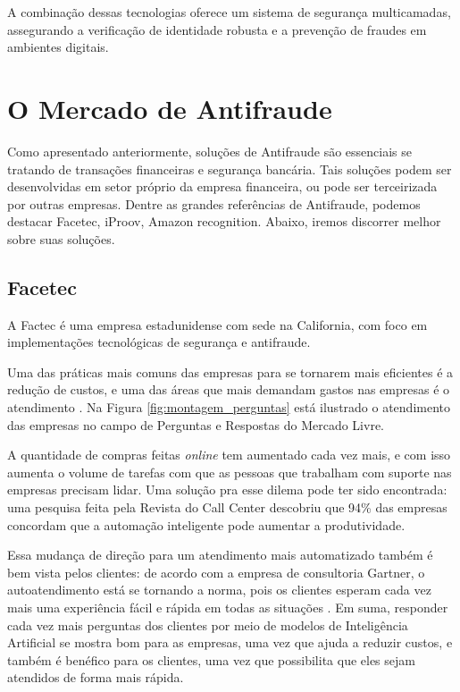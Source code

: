 A combinação dessas tecnologias oferece um sistema de segurança multicamadas, assegurando a verificação de identidade robusta e a prevenção de fraudes em ambientes digitais.

\section{O Mercado de Antifraude}
\label{mercado}
Como apresentado anteriormente, soluções de Antifraude são essenciais se tratando de transações financeiras e segurança bancária. Tais soluções podem ser desenvolvidas em setor próprio da empresa financeira, ou pode ser terceirizada por outras empresas. Dentre as grandes referências de Antifraude, podemos destacar Facetec, iProov, Amazon recognition. Abaixo, iremos discorrer melhor sobre suas soluções.

\subsection{Facetec}
\label{facetec}
A Factec é uma empresa estadunidense com sede na California, com foco em implementações tecnológicas de segurança e antifraude. 

Uma das práticas mais comuns das empresas para se tornarem mais eficientes é a redução de custos, e uma das áreas que mais demandam gastos nas empresas é o atendimento \cite{reduzir_custos}. Na Figura \ref{fig:montagem_perguntas} está ilustrado o atendimento das empresas no campo de Perguntas e Respostas do Mercado Livre.

A quantidade de compras feitas \textit{online} tem aumentado cada vez mais, e com isso aumenta o volume de tarefas com que as pessoas que trabalham com suporte nas empresas precisam lidar. Uma solução pra esse dilema pode ter sido encontrada: uma pesquisa feita pela Revista do Call Center \cite{reduzir_custos} descobriu que 94\% das empresas concordam que a automação inteligente pode aumentar a produtividade.

Essa mudança de direção para um atendimento mais automatizado também é bem vista pelos clientes: de acordo com a empresa de consultoria Gartner, o autoatendimento está se tornando a norma, pois os clientes esperam cada vez mais uma experiência fácil e rápida em todas as situações \cite{ia_como_norma}. Em suma, responder cada vez mais perguntas dos clientes por meio de modelos de Inteligência Artificial se mostra bom para as empresas, uma vez que ajuda a reduzir custos, e também é benéfico para os clientes, uma vez que possibilita que eles sejam atendidos de forma mais rápida.


